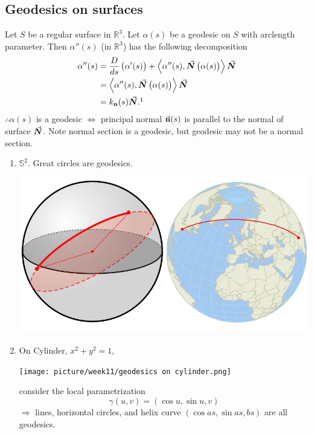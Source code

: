 \subsection*{Geodesics on surfaces}
Let \(S\) be a regular surface in \(\mathbb{R}^3\). Let \(\alpha(s)\)
be a geodesic on \(S\) with arclength parameter. Then \(\alpha''(s)\)
(in \(\mathbb{R}^3\)) has the following decomposition
\begin{align*}
    \alpha''(s)&=\frac{D}{ds}\left(\alpha'(s)\right)+
    \left\langle\alpha''(s),\va*{N}\left(\alpha(s)\right)\right\rangle
    \va*{N}\\
    &=\left\langle\alpha''(s),\va*{N}\left(\alpha(s)\right)\right\rangle
    \va*{N}\\
    &=k_{\vb{n}}(s)\va*{N}.\footnotemark
\end{align*}
\(\therefore \alpha(s)\) is a geodesic \(\Longleftrightarrow\) principal
normal \(\va{n}(s)\) is parallel to the normal of surface \(\va*{N}\).
Note normal section is a geodesic, but geodesic may not be a normal
section.
\begin{enumerate}[(1)]
    \item \(\mathbb{S}^2\). Great circles are geodesics.
    \begin{center}
            \includegraphics[scale=0.7]{picture/week11/geodesics on S2.png}
    \end{center}
    \item On Cylinder, \(x^2+y^2=1\), 
    \begin{center}
        \texttt{[image: picture/week11/geodesics on 
        cylinder.png]}
    \end{center}
    consider the local parametrization
    \[\gamma(u,v)=\left(\cos u ,\sin u,v\right)\]
    \(\Rightarrow\) lines, horizontal circles, and helix curve
    \(\left(\cos as,\sin as, bs\right)\) are all geodesics.
\end{enumerate}